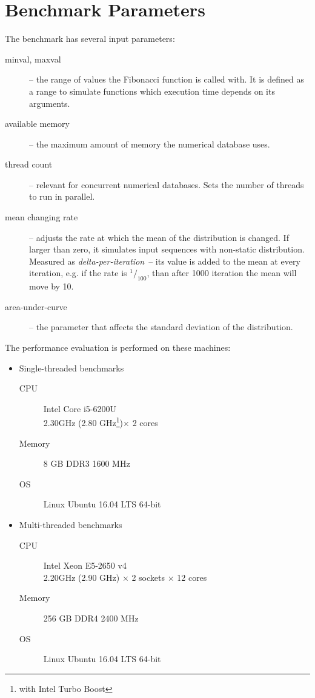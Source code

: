 \section{Benchmark Parameters}
The benchmark has several input parameters:
\begin{description}
\item [minval, maxval]-- the range of values the Fibonacci function is called with. It is defined as a range to simulate functions which execution time depends on its arguments.
\item [available memory]-- the maximum amount of memory the numerical database uses.
\item [thread count]-- relevant for concurrent numerical databases. Sets the number of  threads to run in parallel.
\item[mean changing rate]-- adjusts the rate at which the mean of the distribution is changed. If larger than zero, it simulates input sequences with non-static distribution. Measured as \emph{delta-per-iteration}~-- its value is added to the mean at every iteration, e.g. if the rate is $^1/_{100}$, than after 1000 iteration the mean will move by 10.
\item[area-under-curve]-- the parameter that affects the standard deviation of the distribution.
\end{description}

\pagebreak

The performance evaluation is performed on these machines:
\begin{itemize}
\item Single-threaded benchmarks
    \begin{description}
    \item [CPU] Intel\textsuperscript{\textregistered{}} Core\textsuperscript{\texttrademark{}} i5-6200U \\
    2.30GHz (2.80 GHz\footnote{with Intel\textsuperscript{\textregistered{}} Turbo Boost})$ \times$ 2 cores
    \item [Memory] 8 GB DDR3 1600 MHz
    \item [OS] Linux\textsuperscript{\textregistered{}} Ubuntu\textsuperscript{\textregistered{}} 16.04 LTS 64-bit
    \end{description}
\item Multi-threaded benchmarks
    \begin{description}
    \item [CPU] Intel\textsuperscript{\textregistered{}} Xeon\textsuperscript{\textregistered{}} E5-2650 v4 \\
    2.20GHz (2.90 GHz\footnotemark[1]) $ \times $ 2 sockets $ \times $ 12 cores
    \item [Memory] 256 GB DDR4 2400 MHz
    \item [OS] Linux\textsuperscript{\textregistered{}} Ubuntu\textsuperscript{\textregistered{}} 16.04 LTS 64-bit
    \end{description}
\end{itemize}


